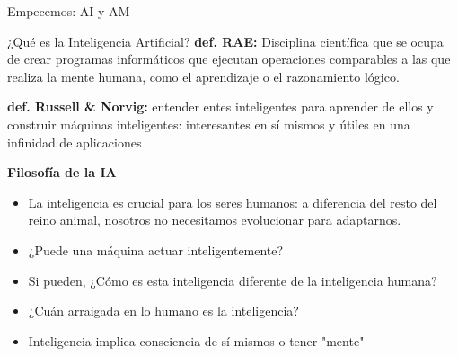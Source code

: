 \documentclass[9pt]{beamer}
\begin{document}
\begin{frame}
\centerline{\large Empecemos: AI y AM}
\thispagestyle{empty}
\end{frame}




\begin{frame}{¿Qué es la Inteligencia Artificial?}
\textbf{def. RAE:} Disciplina científica que se ocupa de crear programas
informáticos que ejecutan operaciones comparables a las que realiza
la mente humana, como el aprendizaje o el razonamiento lógico.\\
\vspace{2em}

\textbf{def. Russell \& Norvig:} entender entes inteligentes para aprender
de ellos y construir máquinas inteligentes: interesantes en sí mismos
y útiles en una infinidad de aplicaciones
\vspace{2em}


\textbf{Filosofía de la IA}
\begin{itemize}
  \item La inteligencia es crucial para los seres humanos: a diferencia del resto del reino animal, nosotros no necesitamos evolucionar para adaptarnos.
  \item ¿Puede una máquina actuar inteligentemente?
  \item Si pueden, ¿Cómo es esta inteligencia diferente de la inteligencia humana?
  \item ¿Cuán arraigada en lo humano es la inteligencia?
  \item Inteligencia implica consciencia de sí mismos o tener "mente"
\end{itemize}

\end{frame}
\end{document}
